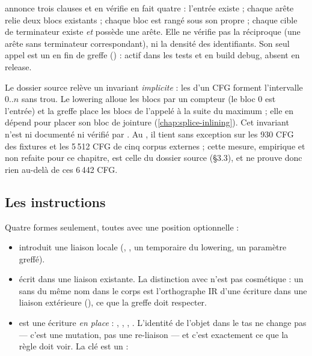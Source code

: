 
 annonce trois clauses et en vérifie en fait quatre : l'entrée existe ; chaque arête relie deux blocs existants ; chaque bloc est rangé sous son propre  ; chaque cible de terminateur existe \emph{et} possède une arête. Elle ne vérifie pas la réciproque (une arête sans terminateur correspondant), ni la densité des identifiants. Son seul appel est un  en fin de greffe () : actif dans les tests et en build debug, absent en release.

\begin{remarque}
Le dossier source relève un invariant \emph{implicite} : les  d'un CFG forment l'intervalle $0..n$ sans trou. Le lowering alloue les blocs par un compteur (le bloc 0 est l'entrée) et la greffe place les blocs de l'appelé à la suite du maximum ; elle en dépend pour placer son bloc de jointure (\cref{chap:splice-inlining}). Cet invariant n'est ni documenté ni vérifié par . Au \snapshotCommit{}, il tient sans exception sur les 930 CFG des fixtures et les 5\,512 CFG de cinq corpus externes ; cette mesure, empirique et non refaite pour ce chapitre, est celle du dossier source (§3.3), et ne prouve donc rien au-delà de ces 6\,442 CFG.
\end{remarque}

\subsection{Les instructions}


Quatre formes seulement, toutes avec une position optionnelle :

\begin{itemize}
  \item {} introduit une liaison locale (, , un temporaire du lowering, un paramètre greffé).
  \item {} écrit dans une liaison existante. La distinction avec  n'est pas cosmétique : un  sans  du même nom dans le corps est \og l'orthographe IR d'une écriture dans une liaison extérieure\fg{} (), ce que la greffe doit respecter.
  \item {} est une écriture \emph{en place} : , , , . L'identité de l'objet dans le tas ne change pas --- c'est une mutation, pas une re-liaison --- et c'est exactement ce que la règle  doit voir. La clé est un  :
\end{itemize}

